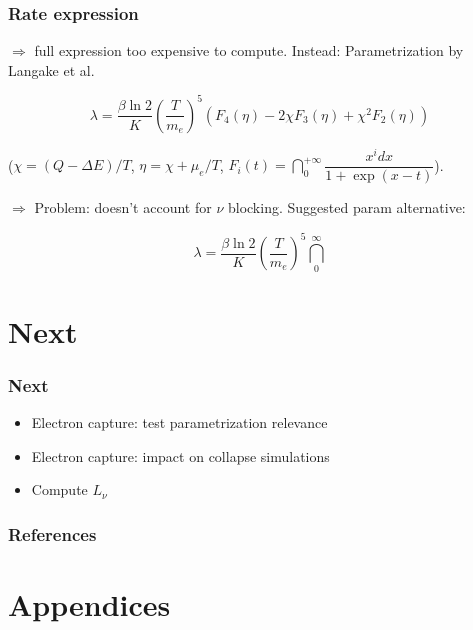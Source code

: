 \documentclass{beamer}
\begin{document}
\begin{frame}
\frametitle{Rate expression}

$\Longrightarrow$ full expression too expensive to compute.
\newline
Instead: Parametrization by Langake et al.

\begin{equation}
\lambda = \dfrac{\beta \ln 2}{K} \left (\dfrac{T}{m_e}\right)^5 \left (F_4(\eta)-2\chi F_3(\eta)+\chi^2 F_2(\eta)\right)
\end{equation}

($\chi = (Q-\Delta E)/T$, $\eta = \chi +\mu_e/T$, $F_i(t) = \dint_{0}^{+\infty} \dfrac{x^i dx}{1+\exp(x-t)}$).

$\Longrightarrow$ Problem: doesn't account for $\nu$ blocking. Suggested param alternative:

\begin{equation}
\lambda = \dfrac{\beta \ln 2}{K} \left (\dfrac{T}{m_e}\right)^5 \dint_{0}^\infty 
\end{equation}
\end{frame}

\section{Next}

\begin{frame}
\frametitle{Next}
\begin{itemize}
\item Electron capture: test parametrization relevance
\item Electron capture: impact on collapse simulations
\item Compute $L_\nu$
\end{itemize}
\end{frame}


\begin{frame}[allowframebreaks]
        \frametitle{References}
        
\end{frame}



\section{Appendices}
\end{document}
